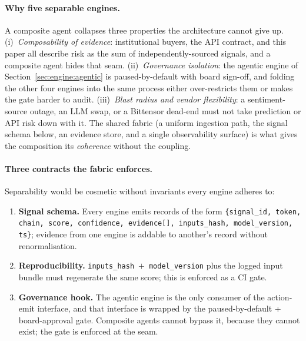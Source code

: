 \documentclass[11pt,a4paper]{article}
\begin{document}
\paragraph{Why five separable engines.} A composite agent collapses three properties
the architecture cannot give up. (i)~\emph{Composability of evidence}: institutional
buyers, the API contract, and this paper all describe risk as the sum of
independently-sourced signals, and a composite agent hides that seam. (ii)~\emph{Governance
isolation}: the agentic engine of Section~\ref{sec:engine:agentic} is paused-by-default
with board sign-off, and folding the other four engines into the same process either
over-restricts them or makes the gate harder to audit. (iii)~\emph{Blast radius and
vendor flexibility}: a sentiment-source outage, an LLM swap, or a Bittensor dead-end
must not take prediction or API risk down with it. The shared fabric (a uniform
ingestion path, the signal schema below, an evidence store, and a single
observability surface) is what gives the composition its \emph{coherence} without the
coupling.

\paragraph{Three contracts the fabric enforces.} Separability would be cosmetic
without invariants every engine adheres to:
\begin{enumerate}
  \item \textbf{Signal schema.} Every engine emits records of the form
        \texttt{\{signal\_id, token, chain, score, confidence, evidence[],
        inputs\_hash, model\_version, ts\}}; evidence from one engine is addable to
        another's record without renormalisation.
  \item \textbf{Reproducibility.} \texttt{inputs\_hash}~$+$~\texttt{model\_version} plus the
        logged input bundle must regenerate the same score; this is enforced as a
        CI gate.
  \item \textbf{Governance hook.} The agentic engine is the only consumer of the
        action-emit interface, and that interface is wrapped by the
        paused-by-default + board-approval gate. Composite agents cannot bypass it,
        because they cannot exist; the gate is enforced at the seam.
\end{enumerate}
\end{document}
